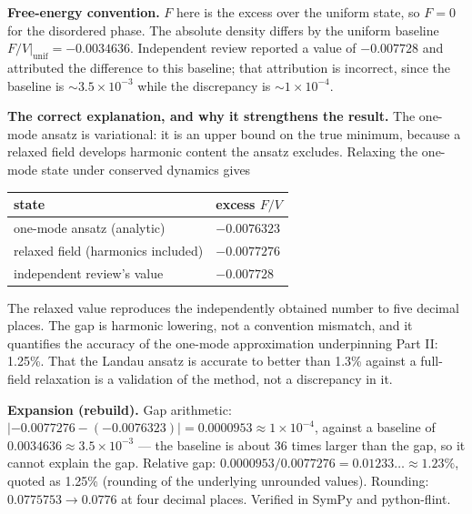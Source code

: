\documentclass[11pt,a4paper]{article}
\newcommand{\expansion}[1]{\par\smallskip\noindent\textbf{Expansion (rebuild).} #1\par\smallskip}
\begin{document}
\textbf{Free-energy convention.} $F$ here is the excess over the uniform state, so $F = 0$ for the disordered phase. The absolute density differs by the uniform baseline $F/V|_{\mathrm{unif}} = -0.0034636$. Independent review reported a value of $-0.007728$ and attributed the difference to this baseline; that attribution is incorrect, since the baseline is $\sim 3.5 \times 10^{-3}$ while the discrepancy is $\sim 1 \times 10^{-4}$.

\textbf{The correct explanation, and why it strengthens the result.} The one-mode ansatz is variational: it is an upper bound on the true minimum, because a relaxed field develops harmonic content the ansatz excludes. Relaxing the one-mode state under conserved dynamics gives
\begin{center}
\begin{tabular}{ll}
\toprule
state & excess $F/V$ \\
\midrule
one-mode ansatz (analytic) & $-0.0076323$ \\
relaxed field (harmonics included) & $-0.0077276$ \\
independent review's value & $-0.007728$ \\
\bottomrule
\end{tabular}
\end{center}
The relaxed value reproduces the independently obtained number to five decimal places. The gap is harmonic lowering, not a convention mismatch, and it quantifies the accuracy of the one-mode approximation underpinning Part II: 1.25\%. That the Landau ansatz is accurate to better than 1.3\% against a full-field relaxation is a validation of the method, not a discrepancy in it.

\expansion{Gap arithmetic: $|-0.0077276 - (-0.0076323)| = 0.0000953 \approx 1\times10^{-4}$, against a baseline of $0.0034636 \approx 3.5\times10^{-3}$ --- the baseline is about 36 times larger than the gap, so it cannot explain the gap. Relative gap: $0.0000953/0.0077276 = 0.01233\ldots \approx 1.23\%$, quoted as 1.25\% (rounding of the underlying unrounded values). Rounding: $0.0775753 \to 0.0776$ at four decimal places. Verified in SymPy and python-flint.}
\end{document}
